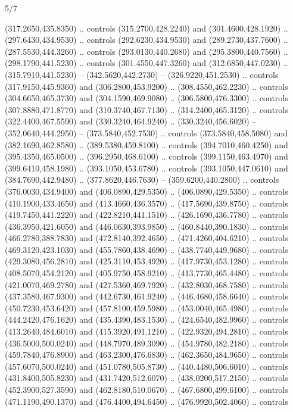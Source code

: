 \begin{flagdescription}{5/7}
\begin{scope}[xshift=0.5\flaglength]
\begin{scope}[scale=0.0019\flagwidth,yshift=190.5mm,xshift=-137.7mm]
\begin{scope}[y=0.80pt, x=0.80pt, yscale=-1, xscale=1, inner sep=0pt, outer sep=0pt]
  (317.2650,435.8350) .. controls (315.2700,428.2240) and (301.4600,428.1920) ..
  (297.6430,434.9530) .. controls (292.6230,434.9530) and (289.2730,437.7600) ..
  (287.5530,444.3260) .. controls (293.0130,440.2680) and (295.3800,440.7560) ..
  (298.1790,441.5230) .. controls (301.4550,447.3260) and (312.6850,447.0230) ..
  (315.7910,441.5230) -- (342.5620,442.2730) -- (326.9220,451.2530) .. controls
  (317.9150,445.9360) and (306.2800,453.9200) .. (308.4550,462.2230) .. controls
  (304.6650,465.3730) and (304.1590,469.9080) .. (306.5800,476.3300) .. controls
  (307.8880,471.8770) and (310.3740,467.7130) .. (314.2400,465.3120) .. controls
  (322.4400,467.5590) and (330.3240,464.9240) .. (330.3240,456.6020) --
  (352.0640,444.2950) -- (373.5840,452.7530) .. controls (373.5840,458.5080) and
  (382.1690,462.8580) .. (389.5380,459.8100) .. controls (394.7010,460.4250) and
  (395.4350,465.0500) .. (396.2950,468.6100) .. controls (399.1150,463.4970) and
  (399.6410,458.1980) .. (393.1050,453.6780) .. controls (393.1050,447.0610) and
  (384.7690,442.9480) .. (377.8620,446.7630) -- (359.6200,440.2800) .. controls
  (376.0030,434.9400) and (406.0890,429.5350) .. (406.0890,429.5350) .. controls
  (410.1900,433.4650) and (413.4660,436.3570) .. (417.5690,439.8750) .. controls
  (419.7450,441.2220) and (422.8210,441.1510) .. (426.1690,436.7780) .. controls
  (436.3950,421.6050) and (446.0630,393.9850) .. (460.8440,390.1830) .. controls
  (466.2780,388.7830) and (472.8140,392.4650) .. (471.4260,404.6210) .. controls
  (469.3120,423.1030) and (455.7860,438.4690) .. (438.7740,449.9680) .. controls
  (429.3080,456.2810) and (425.3110,453.4920) .. (417.9730,453.1280) .. controls
  (408.5070,454.2120) and (405.9750,458.9210) .. (413.7730,465.4480) .. controls
  (421.0070,469.2780) and (427.5360,469.7920) .. (432.8030,468.7580) .. controls
  (437.3580,467.9300) and (442.6730,461.9240) .. (446.4680,458.6640) .. controls
  (450.7230,453.6420) and (457.8100,459.5980) .. (453.0040,465.4980) .. controls
  (444.2420,476.1620) and (435.4390,483.1530) .. (424.6540,482.9960) .. controls
  (413.2640,484.6010) and (415.3920,491.1210) .. (422.9320,494.2810) .. controls
  (436.5000,500.0240) and (448.7970,489.3090) .. (454.9780,482.2180) .. controls
  (459.7840,476.8900) and (463.2300,476.6830) .. (462.3650,484.9650) .. controls
  (457.6070,500.0240) and (451.0780,505.8730) .. (440.4480,506.6010) .. controls
  (431.8400,505.8230) and (431.7420,512.6070) .. (438.0200,517.2150) .. controls
  (452.3900,527.3590) and (462.8180,510.0670) .. (467.6800,499.6100) .. controls
  (471.1190,490.1370) and (476.4400,494.6450) .. (476.9920,502.4060) .. controls

\end{scope}
\end{scope}
\end{scope}
\end{flagdescription}
